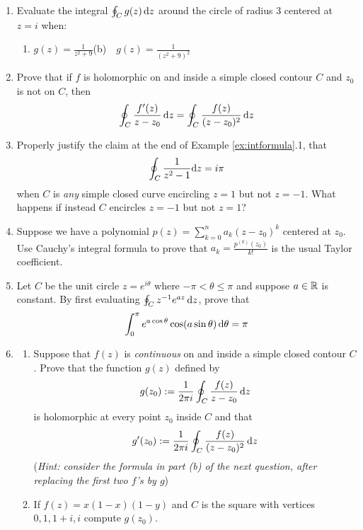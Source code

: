 \begin{exercises}
\begin{enumerate}
	  
	  \item Evaluate the integral $\oint_C g(z)\,{\mathrm{d} z}$ around the circle of radius 3 centered at $z=i$ when:
	  \begin{enumerate}
	    \item $\displaystyle g(z)=\frac 1{z^2+9}$\qquad (b)\ \ $\displaystyle g(z)=\frac 1{(z^2+9)^2}$
	  \end{enumerate} 
	  
	  
	  \item Prove that if $f$ is holomorphic on and inside a simple closed contour $C$ and $z_0$ is not on $C$, then
	  \[
	  	\oint_C\frac{f'(z)}{z-z_0}\,{\mathrm{d} z} =\oint_C\frac{f(z)}{(z-z_0)^2}\,{\mathrm{d} z}
	  \]
	  
	  
	  \item Properly justify the claim at the end of Example \ref{ex:intformula}.1, that
	  \[
	  	\oint_{C}\frac{1}{z^2-1}{\mathrm{d} z}=i\pi
	  \]
	  when $C$ is \emph{any} simple closed curve encircling $z=1$ but not $z=-1$. What happens if instead $C$ encircles $z=-1$ but not $z=1$?
	  
	  
	  \item Suppose we have a polynomial $p(z)=\sum\limits_{k=0}^na_k(z-z_0)^k$ centered at $z_0$.
	  Use Cauchy's integral formula to prove that $a_k=\frac{p^{(k)}(z_0)}{k!}$ is the usual Taylor coefficient.
	  
	  
	  \item Let $C$ be the unit circle $z=e^{i\theta}$ where $-\pi<\theta\le\pi$ and suppose $a\in\mathbb{R}$ is constant. By first evaluating $\oint_Cz^{-1}e^{az}\,{\mathrm{d} z}$, prove that
	  \[
	  	\int_0^\pi e^{a\cos\theta}\cos(a\sin\theta)\,{\mathrm{d}\theta}=\pi
	  \] 
		
		  
	  \item\begin{enumerate}
	     \item Suppose that $f(z)$ is \emph{continuous} on and inside a simple closed contour $C$. Prove that the function $g(z)$ defined by
	    \[
	    	g(z_0):=\frac 1{2\pi i}\oint_C\frac{f(z)}{z-z_0}\,{\mathrm{d} z}
	    \]
	    is holomorphic at every point $z_0$ inside $C$ and that
	    \[
	    	g'(z_0):=\frac 1{2\pi i}\oint_C\frac{f(z)}{(z-z_0)^2}\,{\mathrm{d} z}
	    \]
	    (\emph{Hint: consider the formula in part (b) of the next question, after replacing the first two $f$'s by $g$})
	    
	    \item If $f(z)=x(1-x)(1-y)$ and $C$ is the square with vertices $0,1,1+i,i$ compute $g(z_0)$.
	  \end{enumerate}
	

\end{enumerate}
\end{exercises}
